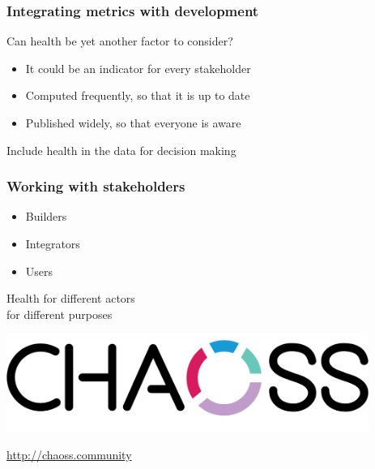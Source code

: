 \documentclass[17pt,aspectratio=169,hyperref=pdfusetitle]{beamer}
\begin{document}
\begin{frame}[fragile]
  \frametitle{Integrating metrics with development}

  Can health be yet another factor to consider?

  \begin{itemize}
  \item It could be an indicator for every stakeholder
  \item Computed frequently, so that it is up to date
  \item Published widely, so that everyone is aware
  \end{itemize}

  Include health in the data for decision making

\end{frame}

\begin{frame}[fragile]
  \frametitle{Working with stakeholders}

  \begin{itemize}
  \item Builders
  \item Integrators
  \item Users
  \end{itemize}

  \vspace{.5cm}

  \begin{flushright}
  Health for different actors \\
  for different purposes \\
  \end{flushright}
  
\end{frame}

\begin{frame}[fragile]

  \begin{center}
  \includegraphics[height=3.2cm]{figs/chaoss}
  \end{center}  

  \url{http://chaoss.community}
  
\end{frame}
\end{document}
